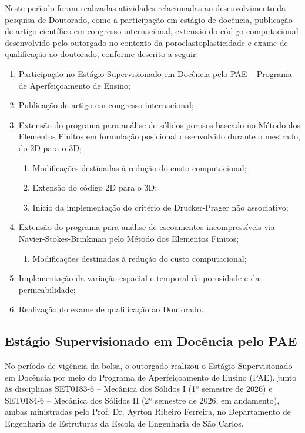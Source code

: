 Neste período foram realizadas atividades relacionadas ao desenvolvimento da pesquisa de Doutorado, como a participação em estágio de docência, publicação de artigo científico em congresso internacional, extensão do código computacional desenvolvido pelo outorgado no contexto da poroelastoplasticidade e exame de qualificação ao doutorado, conforme descrito a seguir:

\begin{enumerate}
    \item Participação no Estágio Supervisionado em Docência pelo PAE -- Programa de Aperfeiçoamento de Ensino;
    \item Publicação de artigo em congresso internacional;
    \item Extensão do programa para análise de sólidos porosos baseado no Método dos Elementos Finitos em formulação posicional desenvolvido durante o mestrado, do 2D para o 3D;
    \begin{enumerate}
        \item Modificações destinadas à redução do custo computacional;
        \item Extensão do código 2D para o 3D;
        \item Início da implementação do critério de Drucker-Prager não associativo;
    \end{enumerate}
    \item Extensão do programa para análise de escoamentos incompressíveis via Navier-Stokes-Brinkman pelo Método dos Elementos Finitos;
    \begin{enumerate}
        \item Modificações destinadas à redução do custo computacional;
    \end{enumerate}
    \item Implementação da variação espacial e temporal da porosidade e da permeabilidade;
    \item Realização do exame de qualificação ao Doutorado.
\end{enumerate}

\subsection{Estágio Supervisionado em Docência pelo PAE}

No período de vigência da bolsa, o outorgado realizou o Estágio Supervisionado em Docência por meio do Programa de Aperfeiçoamento de Ensino (PAE), junto às disciplinas SET0183-6 -- Mecânica dos Sólidos I (1º semestre de 2026) e SET0184-6 -- Mecânica dos Sólidos II (2º semestre de 2026, em andamento), ambas ministradas pelo Prof. Dr. Ayrton Ribeiro Ferreira, no Departamento de Engenharia de Estruturas da Escola de Engenharia de São Carlos.

